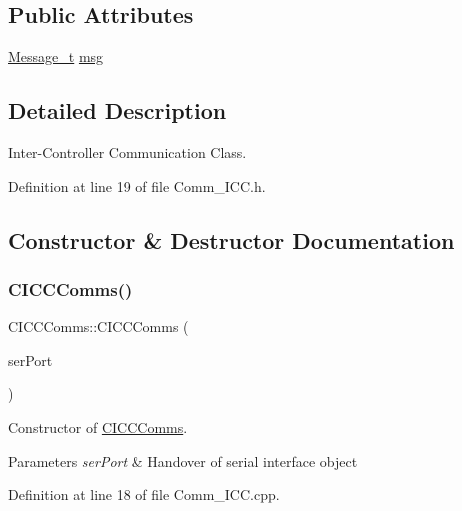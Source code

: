 \subsection*{Public Attributes}
\begin{DoxyCompactItemize}
\item 
\mbox{\hyperlink{struct_c_i_c_c_comms_1_1_message__t}{Message\+\_\+t}} \mbox{\hyperlink{class_c_i_c_c_comms_a35a59d11110d830b70ab5e2a5644bbb9}{msg}}
\end{DoxyCompactItemize}


\subsection{Detailed Description}
Inter-\/\+Controller Communication Class. 

Definition at line 19 of file Comm\+\_\+\+I\+C\+C.\+h.



\subsection{Constructor \& Destructor Documentation}
\mbox{\label{class_c_i_c_c_comms_af2cb9bb6ab473bc5ea2b4aa2f98084ff}} 
\subsubsection{\texorpdfstring{C\+I\+C\+C\+Comms()}{CICCComms()}}
{\footnotesize\ttfamily C\+I\+C\+C\+Comms\+::\+C\+I\+C\+C\+Comms (\begin{DoxyParamCaption}\item[{\mbox{\hyperlink{class_c_serial}{C\+Serial}} \&}]{ser\+Port }\end{DoxyParamCaption})}



Constructor of \mbox{\hyperlink{class_c_i_c_c_comms}{C\+I\+C\+C\+Comms}}. 


\begin{DoxyParams}{Parameters}
{\em ser\+Port} & Handover of serial interface object \\
\hline
\end{DoxyParams}


Definition at line 18 of file Comm\+\_\+\+I\+C\+C.\+cpp.

\mbox{\label{class_c_i_c_c_comms_a951ae11fd2024309bd4ecf67981287e7}} 
